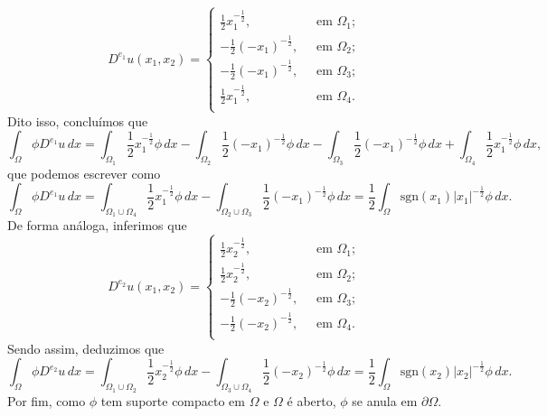 \documentclass[a4paper, 11pt]{book}
\theoremstyle{definition}
\newcommand{\sgn}{\mathrm{sgn}}
\begin{document}
\begin{ex}
    \begin{equation}
        D^{e_1}u(x_1,x_2) =
        \left\{
            \begin{array}{lr}
                \frac{1}{2}x_1^{-\frac{1}{2}}, &\;\text{ em } \Omega_1;\\
                -\frac{1}{2}(-x_1)^{-\frac{1}{2}}, &\;\text{ em } \Omega_2;\\
                -\frac{1}{2}(-x_1)^{-\frac{1}{2}}, &\;\text{ em } \Omega_3;\\
                \frac{1}{2}x_1^{-\frac{1}{2}}, &\;\text{ em } \Omega_4.\\
            \end{array}
        \right.
    \end{equation}
    Dito isso, concluímos que
    \[
        \int_\Omega \phi D^{e_1}u \,dx = \int_{\Omega_1}  \frac{1}{2} x_1^{-\frac{1}{2}}\phi \,dx - \int_{\Omega_2} \frac{1}{2} (-x_1)^{-\frac{1}{2}} \phi \,dx - \int_{\Omega_3} \frac{1}{2} (-x_1)^{-\frac{1}{2}} \phi \,dx + \int_{\Omega_4} \frac{1}{2} x_1^{-\frac{1}{2}} \phi \,dx,
    \]
    que podemos escrever como
    \[
        \int_\Omega \phi D^{e_1} u \,dx = \int_{\Omega_1 \cup \Omega_4}  \frac{1}{2} x_1^{-\frac{1}{2}}\phi \,dx - \int_{\Omega_2 \cup \Omega_3} \frac{1}{2} (-x_1)^{-\frac{1}{2}} \phi \,dx = \frac{1}{2}\int_\Omega \sgn(x_1) |x_1|^{-\frac{1}{2}} \phi \,dx.
    \]
    De forma análoga, inferimos que
    \begin{equation}
        D^{e_2}u(x_1,x_2) =
        \left\{
            \begin{array}{lr}
                \frac{1}{2}x_2^{-\frac{1}{2}}, &\;\text{ em } \Omega_1;\\
                \frac{1}{2}x_2^{-\frac{1}{2}}, &\;\text{ em } \Omega_2;\\
                -\frac{1}{2}(-x_2)^{-\frac{1}{2}}, &\;\text{ em } \Omega_3;\\
                -\frac{1}{2}(-x_2)^{-\frac{1}{2}}, &\;\text{ em } \Omega_4.\\
            \end{array}
        \right.
    \end{equation}
    Sendo assim, deduzimos que
    \[
        \int_\Omega \phi D^{e_2} u \,dx = \int_{\Omega_1 \cup \Omega_2}  \frac{1}{2} x_2^{-\frac{1}{2}}\phi \,dx - \int_{\Omega_3 \cup \Omega_4} \frac{1}{2} (-x_2)^{-\frac{1}{2}} \phi \,dx = \frac{1}{2}\int_\Omega \sgn(x_2) |x_2|^{-\frac{1}{2}} \phi \,dx.
    \]
    Por fim, como $\phi$ tem suporte compacto em $\Omega$ e $\Omega$ é aberto, $\phi$ se anula em $\partial\Omega$.

\end{ex}
\end{document}
